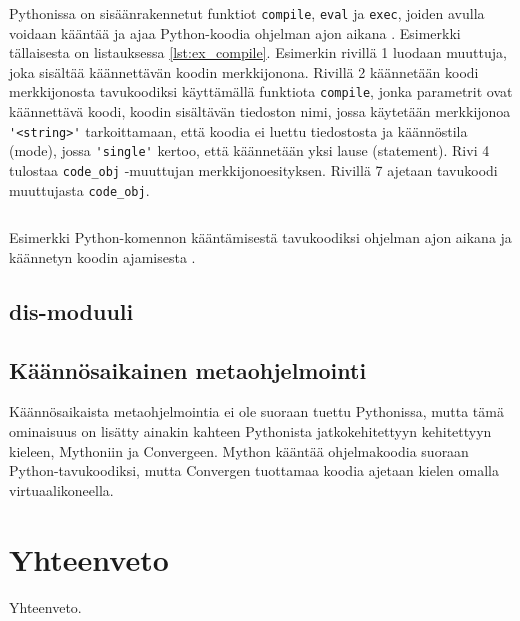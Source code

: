 \documentclass[finnish]{tktltiki2}
\theoremstyle{definition}
\theoremstyle{remark}
\begin{document}


Pythonissa on sisäänrakennetut funktiot \verb|compile|, \verb|eval| ja \verb|exec|, joiden avulla voidaan kääntää ja ajaa Python-koodia ohjelman ajon aikana \cite{codeobjects,martelli2006python}. Esimerkki tällaisesta on listauksessa \ref{lst:ex_compile}. Esimerkin rivillä 1 luodaan muuttuja, joka sisältää käännettävän koodin merkkijonona. Rivillä 2 käännetään koodi merkkijonosta tavukoodiksi käyttämällä funktiota \verb|compile|, jonka parametrit ovat käännettävä koodi, koodin sisältävän tiedoston nimi, jossa käytetään merkkijonoa \verb|'<string>'| tarkoittamaan, että koodia ei luettu tiedostosta ja käännöstila (mode), jossa \verb|'single'| kertoo, että käännetään yksi lause (statement). Rivi 4 tulostaa \verb|code_obj| -muuttujan merkkijonoesityksen. Rivillä 7 ajetaan tavukoodi muuttujasta \verb|code_obj|.

\begin{listing}
    \inputminted[linenos]{python}{code/dynamichello.py}
    \caption{Esimerkki Python-komennon kääntämisestä tavukoodiksi ohjelman ajon aikana ja käännetyn koodin ajamisesta \cite{codeobjects}.}
    \label{lst:ex_compile}
\end{listing}


\subsection{dis-moduuli}



\subsection{Käännösaikainen metaohjelmointi}

Käännösaikaista metaohjelmointia ei ole suoraan tuettu Pythonissa, mutta tämä ominaisuus on lisätty ainakin kahteen Pythonista jatkokehitettyyn kehitettyyn kieleen, Mythoniin\cite{mython} ja Convergeen\cite{tratt05}. Mython kääntää ohjelmakoodia suoraan Python-tavukoodiksi, mutta Convergen tuottamaa koodia ajetaan kielen omalla virtuaalikoneella.


\section{Yhteenveto}

Yhteenveto.


\pagebreak

%
%
% 
%




\lastpage
\end{document}
